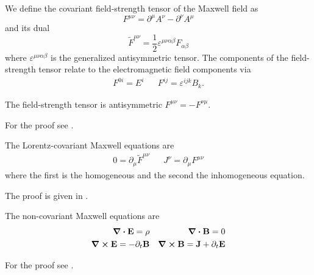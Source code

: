 \begin{definition}
	We define the covariant field-strength tensor of the Maxwell field as
	\begin{equation}
		F^{\mu\nu}
		=
		\partial^\mu A^\nu
		-
		\partial^\nu A^\mu
	\end{equation}
	and its dual
	\begin{equation}
		\tilde{F}^{\mu\nu}
		=
		\frac{1}{2}
		\varepsilon^{\mu\nu\alpha\beta}
		F_{\alpha\beta}
	\end{equation}
	where $\varepsilon^{\mu\nu\alpha\beta}$ is the generalized antisymmetric tensor.
	The components of the field-strength tensor relate to the electromagnetic field components via~\cite[p.~336]{Srednicki2007}
	\begin{align}
		F^{0i}
		=
		E^i
		&&
		F^{ij}
		=
		\varepsilon^{ijk}B_k
		\label{eq:mw_field_strength_components}
		.
	\end{align}
\end{definition}
\begin{lemma}\label{thm:mw_field_strength_antisymmetry}
	The field-strength tensor is antisymmetric $F^{\mu\nu}=-F^{\nu\mu}$.
\end{lemma}
For the proof see .
\begin{theorem}\label{thm:covariant_maxwell_equations}
	The Lorentz-covariant Maxwell equations are
	\begin{align}
		0
		=
		\partial_\mu
		\tilde{F}^{\mu\nu}
		&&
		J^\nu
		=
		\partial_\mu
		F^{\mu\nu}		
	\end{align}
	where the first is the homogeneous and the second the inhomogeneous equation.
\end{theorem}
The proof is given in .
\begin{theorem}\label{thm:non_covarain_maxwell_equations}
	The non-covariant Maxwell equations are
	\begin{align}
		\div\vb{E}
		=
		\rho
		&&
		\div\vb{B}
		=
		0
		\label{eq:mw_homo_vec}
		\\
		\curl\vb{E}
		=
		-
		\partial_t\vb{B}
		&&
		\curl\vb{B}
		=
		\vb{J}
		+
		\partial_t\vb{E}
		\label{eq:mw_inhomo_vec}
	\end{align}
\end{theorem}
For the proof see .

